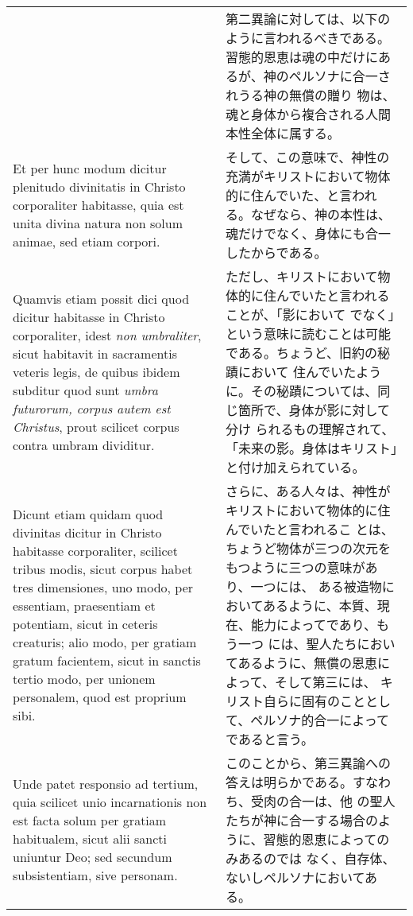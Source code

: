 \documentclass[10pt]{jsarticle} %
\begin{document}
\begin{longtable}{p{21em}p{21em}}
&

第二異論に対しては、以下のように言われるべきである。
習態的恩恵は魂の中だけにあるが、神のペルソナに合一されうる神の無償の贈り
 物は、魂と身体から複合される人間本性全体に属する。


\\

Et per hunc modum dicitur plenitudo divinitatis in Christo
corporaliter habitasse, quia est unita divina natura non solum animae,
sed etiam corpori. 

&

そして、この意味で、神性の充満がキリストにおいて物体的に住んでいた、と言われ
 る。なぜなら、神の本性は、魂だけでなく、身体にも合一したからである。


\\

Quamvis etiam possit dici quod dicitur habitasse in
Christo corporaliter, idest {\itshape non umbraliter}, sicut habitavit in
sacramentis veteris legis, de quibus ibidem subditur quod sunt {\itshape umbra
futurorum, corpus autem est Christus}, prout scilicet corpus contra
umbram dividitur. 

&

ただし、キリストにおいて物体的に住んでいたと言われることが、「影において
 でなく」という意味に読むことは可能である。ちょうど、旧約の秘蹟において
 住んでいたように。その秘蹟については、同じ箇所で、身体が影に対して分け
 られるもの理解されて、「未来の影。身体はキリスト」と付け加えられている。


\\

Dicunt etiam quidam quod divinitas dicitur in Christo
habitasse corporaliter, scilicet tribus modis, sicut corpus habet tres
dimensiones, uno modo, per essentiam, praesentiam et potentiam, sicut in
ceteris creaturis; alio modo, per gratiam gratum facientem, sicut in
sanctis tertio modo, per unionem personalem, quod est proprium sibi.

&

さらに、ある人々は、神性がキリストにおいて物体的に住んでいたと言われるこ
 とは、ちょうど物体が三つの次元をもつように三つの意味があり、一つには、
 ある被造物においてあるように、本質、現在、能力によってであり、もう一つ
 には、聖人たちにおいてあるように、無償の恩恵によって、そして第三には、
 キリスト自らに固有のこととして、ペルソナ的合一によってであると言う。

\\



Unde patet responsio ad tertium, quia scilicet unio incarnationis non
est facta solum per gratiam habitualem, sicut alii sancti uniuntur Deo;
sed secundum subsistentiam, sive personam.

&

このことから、第三異論への答えは明らかである。すなわち、受肉の合一は、他
 の聖人たちが神に合一する場合のように、習態的恩恵によってのみあるのでは
 なく、自存体、ないしペルソナにおいてある。

\end{longtable}
\newpage
\end{document}
